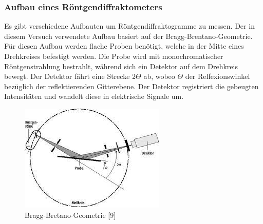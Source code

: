         \subsubsection{Aufbau eines Röntgendiffraktometers}   
            Es gibt verschiedene Aufbauten um Röntgendiffraktogramme zu messen. Der in diesem Versuch verwendete
            Aufbau basiert auf der Bragg-Brentano-Geometrie. Für diesen Aufbau werden flache Proben benötigt, welche in der Mitte
            eines Drehkreises befestigt werden. Die Probe wird mit monochromatischer Röntgenstrahlung bestrahlt, während sich ein
            Detektor auf dem Drehkreis bewegt. Der Detektor fährt eine Strecke 2$\Theta$ ab, wobeo $\Theta$ der Relfexionswinkel bezüglich der reflektierenden Gitterebene. 
            Der Detektor registriert die gebeugten Intensitäten und wandelt diese in elektrische Signale um.
            \begin{figure}[H]
                \centering
                \includegraphics{images/Bragg-Bretano.jpg}
                \caption{Bragg-Bretano-Geometrie [9]}
            \end{figure}

            

